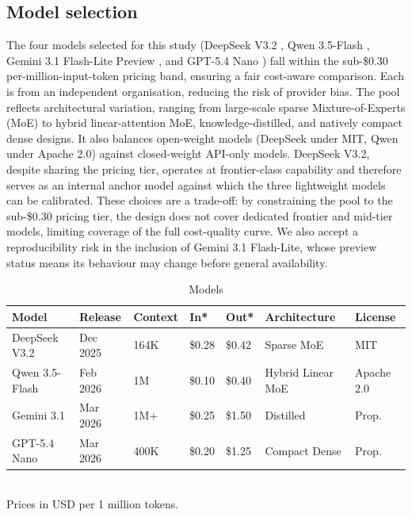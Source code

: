 \documentclass[11pt]{article}
\begin{document}
\subsection{Model selection}
The four models selected for this study (DeepSeek V3.2 \cite{deepseekai2025deepseekv32}, Qwen 3.5-Flash \cite{qwen3.5}, Gemini 3.1 Flash-Lite Preview \cite{gemini3.1}, and GPT-5.4 Nano \cite{gpt5.4}) fall within the sub-\$0.30 per-million-input-token pricing band, ensuring a fair cost-aware comparison.
Each is from an independent organisation, reducing the risk of provider bias.
The pool reflects architectural variation, ranging from large-scale sparse Mixture-of-Experts (MoE) to hybrid linear-attention MoE, knowledge-distilled, and natively compact dense designs.
It also balances open-weight models (DeepSeek under MIT, Qwen under Apache 2.0) against closed-weight API-only models.
DeepSeek V3.2, despite sharing the pricing tier, operates at frontier-class capability and therefore serves as an internal anchor model against which the three lightweight models can be calibrated.
These choices are a trade-off: by constraining the pool to the sub-\$0.30 pricing tier, the design does not cover dedicated frontier and mid-tier models, limiting coverage of the full cost-quality curve.
We also accept a reproducibility risk in the inclusion of Gemini 3.1 Flash-Lite, whose preview status means its behaviour may change before general availability.

\begin{table}[ht]
    \centering
    \caption{Models}
    \label{tab:model_comparison}
    \small
    \begin{tabular*}{\textwidth}{@{\extracolsep{\fill}}lllllll@{}}
        \toprule
        \textbf{Model} & \textbf{Release} & \textbf{Context} & \textbf{In*} & \textbf{Out*} & \textbf{Architecture} & \textbf{License} \\
        \midrule
        DeepSeek V3.2 & Dec 2025 & 164K & \$0.28 & \$0.42 & Sparse MoE & MIT \\
        Qwen 3.5-Flash & Feb 2026 & 1M & \$0.10 & \$0.40 & Hybrid Linear MoE & Apache 2.0 \\
        Gemini 3.1 & Mar 2026 & 1M+ & \$0.25 & \$1.50 & Distilled & Prop. \\
        GPT-5.4 Nano & Mar 2026 & 400K & \$0.20 & \$1.25 & Compact Dense & Prop. \\
        \bottomrule
    \end{tabular*}
    \vspace{2pt}\\
    \small *Prices in USD per 1 million tokens.
\end{table}
\end{document}
